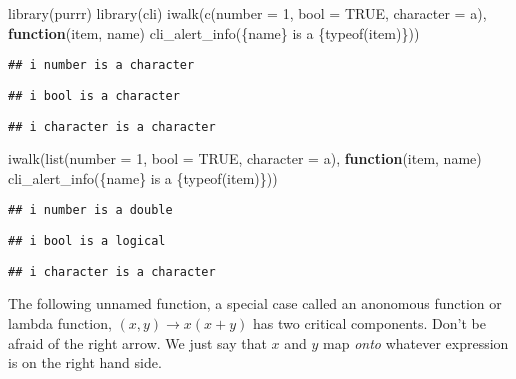 \documentclass[
]{book}
\newenvironment{Shaded}{\begin{snugshade}}{\end{snugshade}}
\newcommand{\AttributeTok}[1]{\textcolor[rgb]{0.77,0.63,0.00}{#1}}
\newcommand{\ConstantTok}[1]{\textcolor[rgb]{0.00,0.00,0.00}{#1}}
\newcommand{\ControlFlowTok}[1]{\textcolor[rgb]{0.13,0.29,0.53}{\textbf{#1}}}
\newcommand{\DecValTok}[1]{\textcolor[rgb]{0.00,0.00,0.81}{#1}}
\newcommand{\FunctionTok}[1]{\textcolor[rgb]{0.00,0.00,0.00}{#1}}
\newcommand{\NormalTok}[1]{#1}
\newcommand{\StringTok}[1]{\textcolor[rgb]{0.31,0.60,0.02}{#1}}
\begin{document}
\begin{Shaded}
\begin{Highlighting}[]
\FunctionTok{library}\NormalTok{(purrr)}
\FunctionTok{library}\NormalTok{(cli)}
\FunctionTok{iwalk}\NormalTok{(}\FunctionTok{c}\NormalTok{(}\AttributeTok{number =} \DecValTok{1}\NormalTok{, }\AttributeTok{bool =} \ConstantTok{TRUE}\NormalTok{, }\AttributeTok{character =} \StringTok{\textquotesingle{}a\textquotesingle{}}\NormalTok{), }\ControlFlowTok{function}\NormalTok{(item, name) }\FunctionTok{cli\_alert\_info}\NormalTok{(}\StringTok{\textquotesingle{}\{name\} is a \{typeof(item)\}\textquotesingle{}}\NormalTok{))}
\end{Highlighting}
\end{Shaded}

\begin{verbatim}
## i number is a character
\end{verbatim}

\begin{verbatim}
## i bool is a character
\end{verbatim}

\begin{verbatim}
## i character is a character
\end{verbatim}

\begin{Shaded}
\begin{Highlighting}[]
\FunctionTok{iwalk}\NormalTok{(}\FunctionTok{list}\NormalTok{(}\AttributeTok{number =} \DecValTok{1}\NormalTok{, }\AttributeTok{bool =} \ConstantTok{TRUE}\NormalTok{, }\AttributeTok{character =} \StringTok{\textquotesingle{}a\textquotesingle{}}\NormalTok{), }\ControlFlowTok{function}\NormalTok{(item, name) }\FunctionTok{cli\_alert\_info}\NormalTok{(}\StringTok{\textquotesingle{}\{name\} is a \{typeof(item)\}\textquotesingle{}}\NormalTok{))}
\end{Highlighting}
\end{Shaded}

\begin{verbatim}
## i number is a double
\end{verbatim}

\begin{verbatim}
## i bool is a logical
\end{verbatim}

\begin{verbatim}
## i character is a character
\end{verbatim}

The following unnamed function, a special case called an anonomous function or lambda function, \((x, y)\rightarrow x(x + y)\) has two critical components. Don't be afraid of the right arrow. We just say that \(x\) and \(y\) map \emph{onto} whatever expression is on the right hand side.
\end{document}
